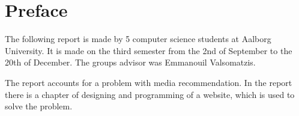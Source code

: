 \chapter*{Preface}
The following report is made by 5 computer science students at Aalborg University. It is made on the third semester from the 2nd of September to the 20th of December. The groups advisor was Emmanouil Valsomatzis.


The report accounts for a problem with media recommendation. In the report there is a chapter of designing and programming of a website, which is used to solve the problem.

